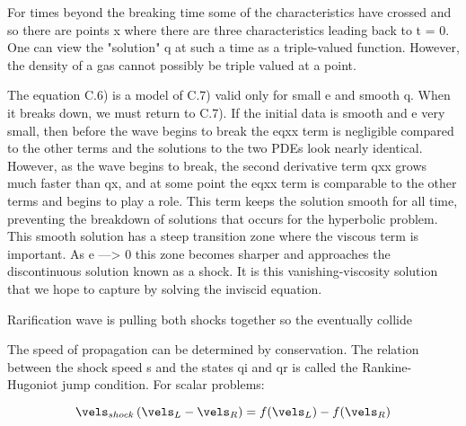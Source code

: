 For times beyond the breaking time some of the characteristics have
crossed and so there are points x where there are three characteristics leading
back to t = 0. One can view the "solution" q at such a time as a triple-valued
function. However, the density of a gas cannot possibly be triple valued at a
point.


The equation C.6) is a model of C.7) valid only for small e and smooth q.
When it breaks down, we must return to C.7). If the
initial data is smooth and e very small, then before the wave begins to break
the eqxx term is negligible compared to the other terms and the solutions to
the two PDEs look nearly identical. However, as the wave begins to break,
the second derivative term qxx grows much faster than qx, and at some point
the eqxx term is comparable to the other terms and begins to play a role.
This term keeps the solution smooth for all time, preventing the breakdown
of solutions that occurs for the hyperbolic problem. This smooth solution has
a steep transition zone where the viscous term is important. As e —> 0 this
zone becomes sharper and approaches the discontinuous solution known as
a shock. It is this vanishing-viscosity solution that we hope to capture by
solving the inviscid equation.

Rarification wave is pulling both shocks together so the eventually collide

The speed of propagation can be determined by conservation. The relation
between the shock speed s and the states qi and qr is called the Rankine-
Hugoniot jump condition. For scalar problems:

\begin{equation}
\vels_{shock}\,(\vels_L - \vels_R) = f(\vels_L) - f(\vels_R)
\end{equation}

